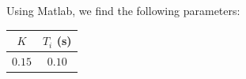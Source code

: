 Using Matlab, we find the following parameters:
\begin{center}
 \begin{tabular}{|c|c|}
 \hline
 $K$ & $T_i$ (s) \\
 \hline
 $0.15$ & $0.10$ \\
 \hline
 \end{tabular}
\end{center}